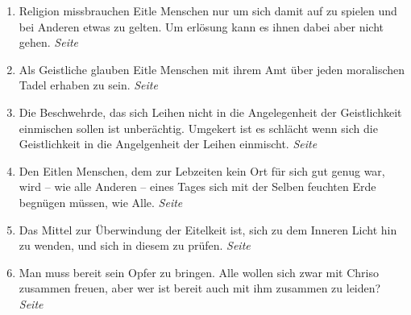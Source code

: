 \begin{enumerate}
\begin{enumerate}
 \item Religion missbrauchen Eitle Menschen nur um sich damit auf zu spielen und bei Anderen etwas zu gelten. Um erlösung kann es ihnen dabei aber nicht gehen.
 \dotfill \textit{Seite \pageref{ref:12_07_eitle_menschen_religion_2}}\\
 
 \item Als Geistliche glauben Eitle Menschen mit ihrem Amt über jeden moralischen Tadel erhaben zu sein.
 \dotfill \textit{Seite \pageref{ref:12_07_eitle_menschen_geislicher}}\\
 
 \item Die Beschwehrde, das sich Leihen nicht in die Angelegenheit der Geistlichkeit einmischen sollen ist unberächtig. Umgekert ist es schlächt wenn sich die Geistlichkeit in die Angelgenheit der Leihen einmischt.
 \dotfill \textit{Seite \pageref{ref:12_08_eitle_menschen_leihen_vs_geisltichkeit}}\\
 
 \item Den Eitlen Menschen, dem zur Lebzeiten kein Ort für sich gut genug war, wird -- wie alle Anderen -- eines Tages sich mit der Selben feuchten Erde begnügen müssen, wie Alle. 
 \dotfill \textit{Seite \pageref{ref:12_10_eitle_menschen_tod}}\\
 
 \item Das Mittel zur Überwindung der Eitelkeit ist, sich zu dem Inneren Licht hin zu wenden, und sich in diesem zu prüfen.
 \dotfill \textit{Seite \pageref{ref:12_11_eitle_menschen_erloesung}}\\
 
 \item Man muss bereit sein Opfer zu bringen. Alle wollen sich zwar mit Chriso zusammen freuen, aber wer ist bereit auch mit ihm zusammen zu leiden?
 \dotfill \textit{Seite \pageref{ref:12_11_opfer}}\\
 
 \end{enumerate}


\end{enumerate}
